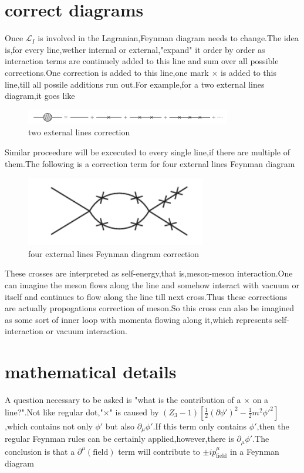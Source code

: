 \documentclass[a4paper]{article}
\begin{document}
\section{correct  diagrams}
Once $\mathscr{L}_I$ is involved in the Lagranian,Feynman diagram needs to change.The idea is,for every line,wether internal or external,"expand" it order by order as interaction terms are continuely added to this line and sum over all possible corrections.One correction is added to this line,one mark $\times$ is added to this line,till all possile additions run out.For example,for a two external lines diagram,it goes like
\begin{figure}[htbp]
	\centering
	\includegraphics[width=0.8\textwidth]{22.png}
	\caption{two external lines correction}
\end{figure}

Similar proceedure will be excecuted to every single line,if there are multiple of them.The following is a correction term for four external lines Feynman diagram
\begin{figure}[htbp]
	\centering
	\includegraphics[width=0.7\textwidth]{23.png}
	\caption{four external lines Feynman diagram correction}
\end{figure}

These crosses are interpreted as self-energy,that is,meson-meson interaction.One can imagine the meson flows along the line and somehow interact with vacuum or itself and continues to flow along the line till next cross.Thus these corrections are actually propogations correction of meson.So this cross can also be imagined as some sort of inner loop with momenta flowing along it,which represents self-interaction or vacuum interaction.
\section{mathematical details}
A question necessary to be asked is "what is the contribution of a $\times$ on a line?".Not like regular dot,"$\times$" is caused by $(Z_3-1)[\frac{1}{2}(\partial\phi')^2-\frac{1}{2}m^2\phi'^2]$,which contains not only $\phi'$ but also $\partial_{\mu}\phi'$.If this term only contains $\phi'$,then the regular Feynman rules can be certainly applied,however,there is $\partial_{\mu}\phi'$.The conclusion is that a $\partial^{\mu}(\text{field})$ term will contribute to $\pm ip^{\mu}_{\text{field}}$ in a Feynman diagram
\end{document}

